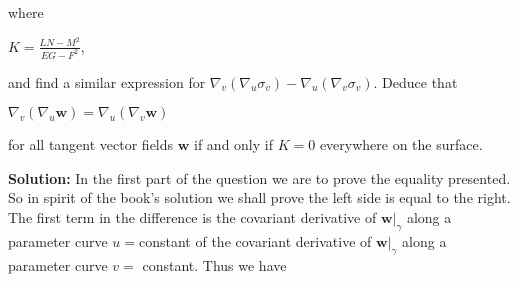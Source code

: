 \documentclass[12pt, a4paper]{article}
\begin{document}
\begin{flushleft}
\vspace{4mm}

    where\par
    
\vspace{4mm}

        \centerline{$K=\frac{LN-M^2}{EG-F^2}$,}
        
\vspace{4mm}

    and find a similar expression for $\nabla_v(\nabla_u\sigma_v)-\nabla_u(\nabla_v\sigma_v)$. Deduce that\par
    
\vspace{4mm}

        \centerline{$\nabla_v(\nabla_u\mathbf{w})=\nabla_u(\nabla_v\mathbf{w})$}
        
\vspace{4mm}

    for all tangent vector fields $\mathbf{w}$ if and only if $K=0$ everywhere on the surface.
    
\vspace{16mm}

    \textbf{Solution: }In the first part of the question we are to prove the equality presented. So in spirit of the book's solution we shall prove the left side is equal to the right. The first term in the difference is the covariant derivative of $\mathbf{w}|_{\gamma}$ along a parameter curve $u=$constant of the covariant derivative of $\mathbf{w}|_{\gamma}$ along a parameter curve $v=$ constant. Thus we have\par
    

    
\end{flushleft}
\end{document}
